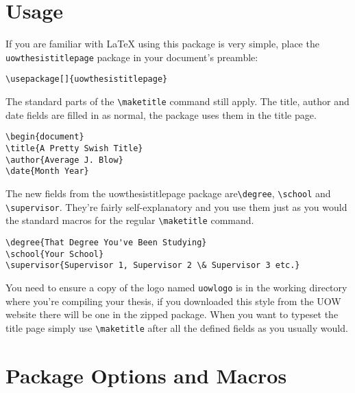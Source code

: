 \documentclass[12pt,oneside]{article}
\newcommand{\oporcom}[1]{\texttt{\color{RoyalBlue}#1}} %
\begin{document}
\section{Usage}
If you are familiar with LaTeX using this package is very simple, place the \texttt{uowthesistitlepage} package in your document's preamble:
\begin{verbatim}
\usepackage[]{uowthesistitlepage} 
\end{verbatim}
The standard parts of the \verb+\maketitle+ command still apply. The title, author and date fields are filled in as normal, the package uses them in the title page.
\begin{verbatim}
\begin{document}
\title{A Pretty Swish Title} 
\author{Average J. Blow}
\date{Month Year}
\end{verbatim}
The new fields from the uowthesistitlepage package are\oporcom{\textbackslash{}degree}, \oporcom{\textbackslash{}school} and \oporcom{\textbackslash{}supervisor}. They're fairly self-explanatory and you use them just as you would the standard macros for the regular \verb+\maketitle+ command.  
\begin{verbatim}
\degree{That Degree You've Been Studying} 
\school{Your School} 
\supervisor{Supervisor 1, Supervisor 2 \& Supervisor 3 etc.}
\end{verbatim}
You need to ensure a copy of the logo named \texttt{uow\textunderscore{}logo} is in the working directory where you're compiling your thesis, if you downloaded this style from the UOW website there will be one in the zipped package. When you want to typeset the title page simply use \verb+\maketitle+ after all the defined fields as you usually would.

\section{Package Options and Macros}
\end{document}

